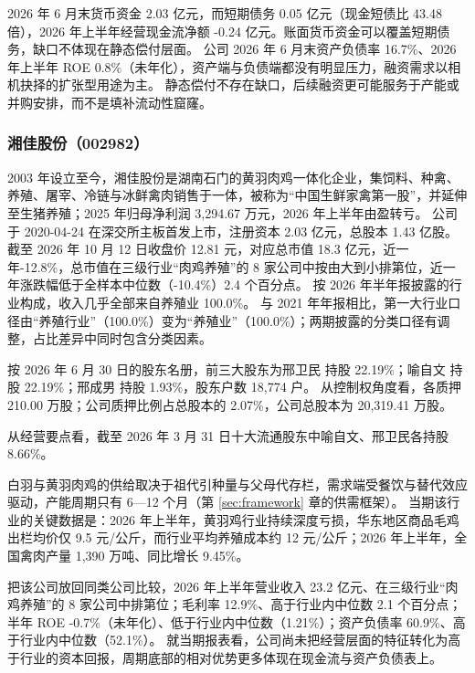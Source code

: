  2026 年 6 月末货币资金 2.03 亿元，而短期债务 0.05 亿元（现金短债比 43.48 倍），2026 年上半年经营现金流净额 -0.24 亿元。账面货币资金可以覆盖短期债务，缺口不体现在静态偿付层面。 公司 2026 年 6 月末资产负债率 16.7\%、2026 年上半年 ROE 0.8\%（未年化），资产端与负债端都没有明显压力，融资需求以相机抉择的扩张型用途为主。 静态偿付不存在缺口，后续融资更可能服务于产能或并购安排，而不是填补流动性窟窿。




\subsubsection{湘佳股份（002982）}
\label{co:002982}

 2003 年设立至今，湘佳股份是湖南石门的黄羽肉鸡一体化企业，集饲料、种禽、养殖、屠宰、冷链与冰鲜禽肉销售于一体，被称为“中国生鲜家禽第一股”，并延伸至生猪养殖；2025 年归母净利润 3,294.67 万元，2026 年上半年由盈转亏。 公司于 2020-04-24 在深交所主板首发上市，注册资本 2.03 亿元，总股本 1.43 亿股。 截至 2026 年 10 月 12 日收盘价 12.81 元，对应总市值 18.3 亿元，近一年-12.8\%，总市值在三级行业“肉鸡养殖”的 8 家公司中按由大到小排第位，近一年涨跌幅低于全样本中位数（-10.4\%）2.4 个百分点。 按 2026 年半年报披露的行业构成，收入几乎全部来自养殖业 100.0\%。 与 2021 年年报相比，第一大行业口径由“养殖行业”（100.0\%）变为“养殖业”（100.0\%）；两期披露的分类口径有调整，占比差异中同时包含分类因素。

 按 2026 年 6 月 30 日的股东名册，前三大股东为邢卫民 持股 22.19\%；喻自文 持股 22.19\%；邢成男 持股 1.93\%，股东户数 18,774 户。 从控制权角度看，各质押 210.00 万股；公司质押比例占总股本的 2.07\%，公司总股本为 20,319.41 万股。

 从经营要点看，截至 2026 年 3 月 31 日十大流通股东中喻自文、邢卫民各持股 8.66\%。

 白羽与黄羽肉鸡的供给取决于祖代引种量与父母代存栏，需求端受餐饮与替代效应驱动，产能周期只有 6---12 个月（第 \ref{sec:framework} 章的供需框架）。 当期该行业的关键数据是：2026 年上半年，黄羽鸡行业持续深度亏损，华东地区商品毛鸡出栏均价仅 9.5 元/公斤，而行业平均养殖成本约 12 元/公斤；2026 年上半年，全国禽肉产量 1,390 万吨、同比增长 9.45\%。

 把该公司放回同类公司比较，2026 年上半年营业收入 23.2 亿元、在三级行业“肉鸡养殖”的 8 家公司中排第位；毛利率 12.9\%、高于行业内中位数 2.1 个百分点；半年 ROE -0.7\%（未年化）、低于行业内中位数（1.21\%）；资产负债率 60.9\%、高于行业内中位数（52.1\%）。 就当期报表看，公司尚未把经营层面的特征转化为高于行业的资本回报，周期底部的相对优势更多体现在现金流与资产负债表上。

